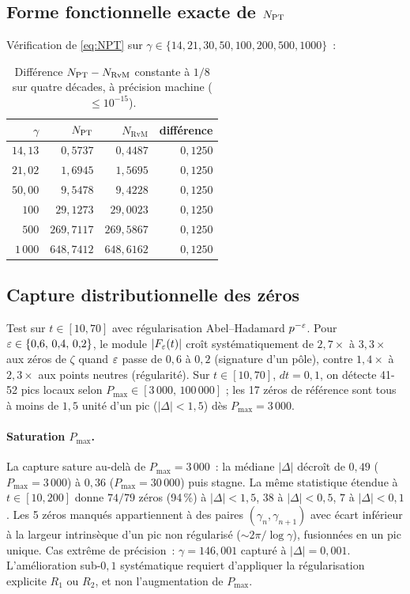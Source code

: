 \subsection{Forme fonctionnelle exacte de $N_{\mathrm{PT}}$}
\label{sec:verif_NPT}

Vérification de \eqref{eq:NPT} sur
$\gamma \in \{14, 21, 30, 50, 100, 200, 500, 1000\}$~:

\begin{table}[ht]
\centering
\begin{tabular}{@{}rrrr@{}}
\toprule
$\gamma$ & $N_{\mathrm{PT}}$ & $N_{\mathrm{RvM}}$ & différence\\
\midrule
$14{,}13$ & $0{,}5737$ & $0{,}4487$ & $0{,}1250$\\
$21{,}02$ & $1{,}6945$ & $1{,}5695$ & $0{,}1250$\\
$50{,}00$ & $9{,}5478$ & $9{,}4228$ & $0{,}1250$\\
$100$ & $29{,}1273$ & $29{,}0023$ & $0{,}1250$\\
$500$ & $269{,}7117$ & $269{,}5867$ & $0{,}1250$\\
$1\,000$ & $648{,}7412$ & $648{,}6162$ & $0{,}1250$\\
\bottomrule
\end{tabular}
\caption{Différence $N_{\mathrm{PT}} - N_{\mathrm{RvM}}$ constante à $1/8$ sur quatre
décades, à précision machine ($\le 10^{-15}$).}
\label{tab:verif_residu}
\end{table}

\subsection{Capture distributionnelle des zéros}
\label{sec:verif_capture}

Test sur $t \in [10, 70]$ avec régularisation Abel--Hadamard $p^{-\varepsilon}$.
Pour $\varepsilon \in \{0{,}6,\,0{,}4,\,0{,}2\}$, le module $|F_\varepsilon(t)|$ croît
systématiquement de $2{,}7\times$ à $3{,}3\times$ aux zéros de $\zeta$
quand $\varepsilon$ passe de $0{,}6$ à $0{,}2$ (signature d'un pôle), contre
$1{,}4\times$ à $2{,}3\times$ aux points neutres (régularité). Sur
$t \in [10, 70]$, $dt = 0{,}1$, on détecte 41-52 pics locaux selon
$P_{\max} \in [3\,000,\, 100\,000]$ ; les 17 zéros de référence sont
tous à moins de $1{,}5$ unité d'un pic ($|\Delta| < 1{,}5$) dès
$P_{\max} = 3\,000$.

\paragraph{Saturation $P_{\max}$.}
La capture sature au-delà de $P_{\max} = 3\,000$~: la médiane $|\Delta|$
décroît de $0{,}49$ ($P_{\max} = 3\,000$) à $0{,}36$ ($P_{\max} = 30\,000$)
puis stagne. La même statistique étendue à $t \in [10, 200]$ donne
$74/79$ zéros (94\,\%) à $|\Delta| < 1{,}5$, $38$ à $|\Delta| < 0{,}5$,
$7$ à $|\Delta| < 0{,}1$. Les 5 zéros manqués appartiennent à des paires
$(\gamma_n, \gamma_{n+1})$ avec écart inférieur à la largeur intrinsèque
d'un pic non régularisé ($\sim 2\pi/\log\gamma$), fusionnées en un pic
unique. Cas extrême de précision~: $\gamma = 146{,}001$ capturé à
$|\Delta| = 0{,}001$. L'amélioration sub-$0{,}1$ systématique requiert
d'appliquer la régularisation explicite $R_1$ ou $R_2$, et non
l'augmentation de $P_{\max}$.

